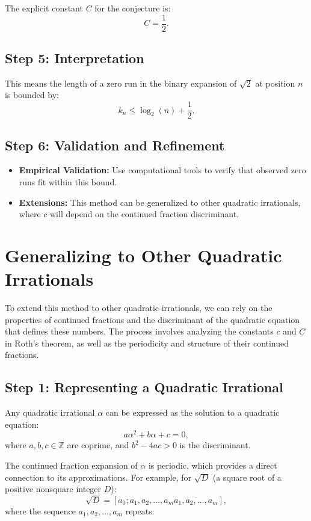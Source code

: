 The explicit constant \(C\) for the conjecture is:
\[
C = \frac{1}{2}.
\]

\subsection*{Step 5: Interpretation}

This means the length of a zero run in the binary expansion of \(\sqrt{2}\) at position \(n\) is bounded by:
\[
k_n \leq \log_2(n) + \frac{1}{2}.
\]

\subsection*{Step 6: Validation and Refinement}

\begin{itemize}
    \item \textbf{Empirical Validation:} Use computational tools to verify that observed zero runs fit within this bound.
    \item \textbf{Extensions:} This method can be generalized to other quadratic irrationals, where \(c\) will depend on the continued fraction discriminant.
\end{itemize}

\section*{Generalizing to Other Quadratic Irrationals}

To extend this method to other quadratic irrationals, we can rely on the properties of continued fractions and the discriminant of the quadratic equation that defines these numbers. The process involves analyzing the constants \(c\) and \(C\) in Roth's theorem, as well as the periodicity and structure of their continued fractions.

\subsection*{Step 1: Representing a Quadratic Irrational}

Any quadratic irrational \(\alpha\) can be expressed as the solution to a quadratic equation:
\[
a\alpha^2 + b\alpha + c = 0,
\]
where \(a, b, c \in \mathbb{Z}\) are coprime, and \(b^2 - 4ac > 0\) is the discriminant.

The continued fraction expansion of \(\alpha\) is periodic, which provides a direct connection to its approximations. For example, for \(\sqrt{D}\) (a square root of a positive nonsquare integer \(D\)):
\[
\sqrt{D} = [a_0; a_1, a_2, \ldots, a_m\overline{a_1, a_2, \ldots, a_m}],
\]
where the sequence \(a_1, a_2, \ldots, a_m\) repeats.

